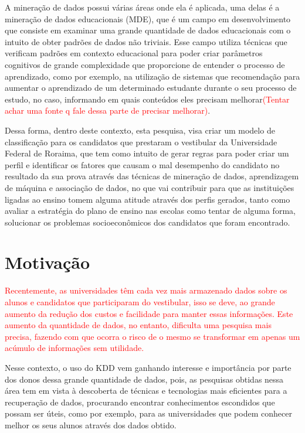 \par
A mineração de dados possui várias áreas onde ela é aplicada, uma delas é a mineração de dados educacionais (MDE), que é um campo em desenvolvimento que consiste em examinar uma grande quantidade de dados educacionais com o intuito de obter padrões de dados não triviais. Esse campo utiliza técnicas que verificam padrões em contexto educacional para poder criar parâmetros cognitivos de grande complexidade que proporcione de entender o processo de aprendizado, como por exemplo, na utilização de sistemas que recomendação para aumentar o aprendizado de um determinado estudante durante o seu processo de estudo, no caso, informando em quais conteúdos eles precisam melhorar\textcolor{red}{(Tentar achar uma fonte q fale dessa parte de precisar melhorar)}.

\par
Dessa forma, dentro deste contexto, esta pesquisa, visa criar um modelo de classificação para os candidatos que prestaram o vestibular da Universidade Federal de Roraima,  que tem como intuito de gerar regras para poder criar um perfil e identificar os fatores que causam o mal desempenho do candidato no resultado da sua prova através das técnicas de mineração de dados, aprendizagem de máquina e associação de dados, no que vai contribuir para que as instituições ligadas ao ensino tomem alguma atitude através dos perfis gerados, tanto como avaliar a estratégia do plano de ensino nas escolas como tentar de alguma forma, solucionar os problemas socioeconômicos dos candidatos que foram encontrado.







\section{Motivação}

\textcolor{red}{Recentemente, as universidades têm cada vez mais armazenado dados sobre os alunos e candidatos que participaram do vestibular, isso se deve, ao  grande aumento da redução dos custos e facilidade para manter essas informações. Este aumento da quantidade de dados, no entanto, dificulta uma pesquisa mais precisa, fazendo com que ocorra o risco de o mesmo se transformar em apenas um acúmulo de informações sem utilidade.}

\par
Nesse contexto, o uso do KDD vem ganhando interesse e importância por parte dos donos dessa grande quantidade de dados, pois, as pesquisas obtidas nessa área tem em vista à descoberta de técnicas e tecnologias mais eficientes para a recuperação de dados, procurando encontrar conhecimentos escondidos que possam ser úteis, como por exemplo, para as universidades que podem conhecer melhor os seus alunos através dos dados obtido.

